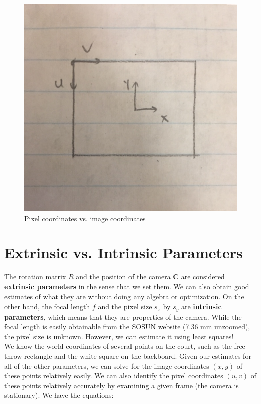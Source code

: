 \documentclass{article}
\begin{document}
\begin{figure}[H]
\includegraphics[scale=0.3]{Pixel_Coordinates}
\centering
\caption{Pixel coordinates vs. image coordinates}
\end{figure}

\section{Extrinsic vs. Intrinsic Parameters}
The rotation matrix $R$ and the position of the camera $\bm{C}$ are considered \textbf{extrinsic parameters} in the sense that we set them. We can also obtain good estimates of what they are without doing any algebra or optimization. On the other hand, the focal length $f$ and the pixel size $s_{x}$ by $s_{y}$ are \textbf{intrinsic parameters}, which means that they are properties of the camera. While the focal length is easily obtainable from the SOSUN website (7.36 mm unzoomed), the pixel size is unknown. However, we can estimate it using least squares! \\

We know the world coordinates of several points on the court, such as the free-throw rectangle and the white square on the backboard. Given our estimates for all of the other parameters, we can solve for the image coordinates $(x, y)$ of these points relatively easily. We can also identify the pixel coordinates $(u, v)$ of these points relatively accurately by examining a given frame (the camera is stationary). We have the equations:
\end{document}
